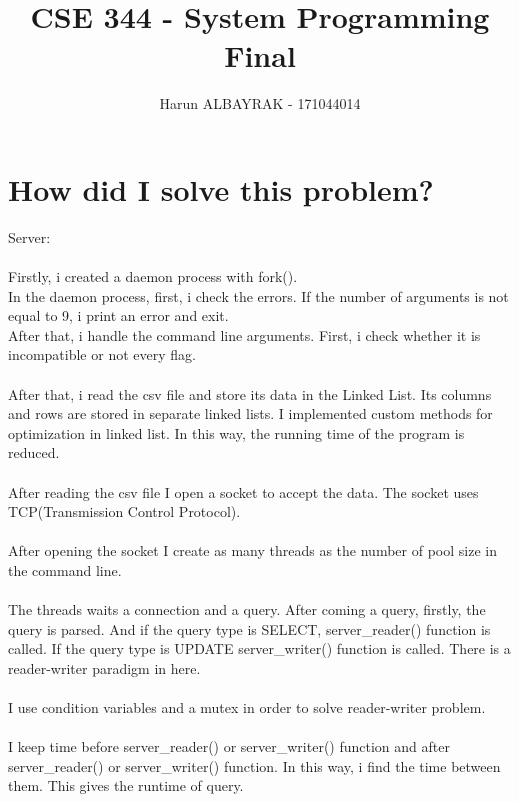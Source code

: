 \documentclass[20pt]{article}
\begin{document}
\title{%
  CSE 344 - System Programming \\
  \large Final}

\author{Harun ALBAYRAK - 171044014}

\maketitle

\Large
\section{How did I solve this problem?}

Server:\\\\
Firstly, i created a daemon process with fork().\\
In the daemon process, first, i check the errors. If the number of arguments is not equal to 9, i print an error and exit.\\
After that, i handle the command line arguments. First, i check whether it is incompatible or not every flag. 
\\\\
After that, i read the csv file and store its data in the Linked List. Its columns and rows are stored in separate linked lists. I implemented custom methods for optimization in linked list. In this way, the running time of the program is reduced.
\\\\
After reading the csv file I open a socket to accept the data. The socket uses TCP(Transmission Control Protocol).
\\\\
After opening the socket I create as many threads as the number of pool size in the command line. 
\\\\
The threads waits a connection and a query. After coming a query, firstly, the query is parsed. And if the query type is SELECT, server\_reader() function is called. If the query type is UPDATE server\_writer() function is called. There is a reader-writer paradigm in here. 
\\\\
I use condition variables and a mutex in order to solve reader-writer problem. 
\\\\
I keep time before server\_reader() or server\_writer() function and after server\_reader() or server\_writer() function. In this way, i find the time between them. This gives the runtime of query.  
\end{document}
